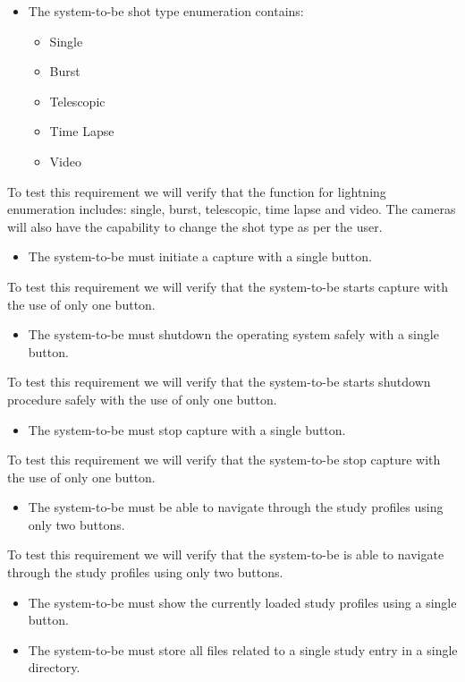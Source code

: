 \begin{itemize}
    \item The system-to-be shot type enumeration contains:
	      \begin{itemize}
		      \item Single
		      \item Burst
		      \item Telescopic
		      \item Time Lapse
		      \item Video
	      \end{itemize}
\end{itemize}
To test this requirement we will verify that the function for lightning enumeration includes: single, burst, telescopic, time lapse and video. The cameras will also have the capability to change the shot type as per the user.
\begin{itemize}
    \item The system-to-be must initiate a capture with a single button.
\end{itemize}
To test this requirement we will verify that the system-to-be starts capture with the use of only one button.
\begin{itemize}
    \item The system-to-be must shutdown the operating system safely with a single button.
\end{itemize}
To test this requirement we will verify that the system-to-be starts shutdown procedure safely with the use of only one button.
\begin{itemize}
    \item The system-to-be must stop capture with a single button.
\end{itemize}
To test this requirement we will verify that the system-to-be stop capture with the use of only one button.
\begin{itemize}
   \item The system-to-be must be able to navigate through the study profiles using only two buttons.
\end{itemize}
To test this requirement we will verify that the system-to-be is able to navigate through the study profiles using only two buttons.
\begin{itemize}
	\item The system-to-be must show the currently loaded study profiles using a single button.
\end{itemize}
\begin{itemize}
    \item The system-to-be must store all files related to a single study entry in a single directory.
\end{itemize}
